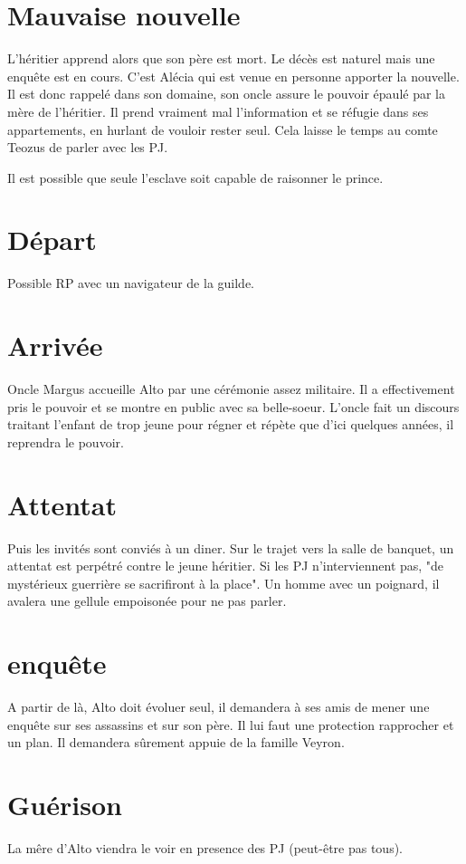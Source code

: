 \documentclass[oneside,12pt]{book}
\begin{document}
\begin{flushleft}
\section{Mauvaise nouvelle}
L'héritier apprend alors que son père est mort. Le décès est naturel mais une enquête est en cours. C'est Alécia qui est venue en personne apporter la nouvelle. 
Il est donc rappelé dans son domaine, son oncle assure le pouvoir épaulé par la mère de l'héritier.
Il prend vraiment mal l'information et se réfugie dans ses appartements, en hurlant de vouloir rester seul. 
Cela laisse le temps au comte Teozus de parler avec les PJ. 

Il est possible que seule l'esclave soit capable de raisonner le prince.

\section{Départ}
Possible RP avec un navigateur de la guilde. 

\section{Arrivée}
Oncle Margus accueille Alto par une cérémonie assez militaire. Il a effectivement pris le pouvoir et se montre en public avec sa belle-soeur. 
L'oncle fait un discours traitant l'enfant de trop jeune pour régner et répète que d'ici quelques années, il reprendra le pouvoir.

\section{Attentat}
Puis les invités sont conviés à un diner. Sur le trajet vers la salle de banquet, un attentat est perpétré contre le jeune héritier. 
Si les PJ n'interviennent pas,  "de mystérieux guerrière se sacrifiront à la place".
Un homme avec un poignard, il avalera une gellule empoisonée pour ne pas parler. 

\section{enquête}
A partir de là, Alto doit évoluer seul, il demandera à ses amis de mener une enquête sur ses assassins et sur son père. Il lui faut une protection rapprocher et un plan.
Il demandera sûrement appuie de la famille Veyron. 

\section{Guérison}
La mêre d'Alto viendra le voir en presence des PJ (peut-être pas tous).


\end{flushleft}
\end{document}
